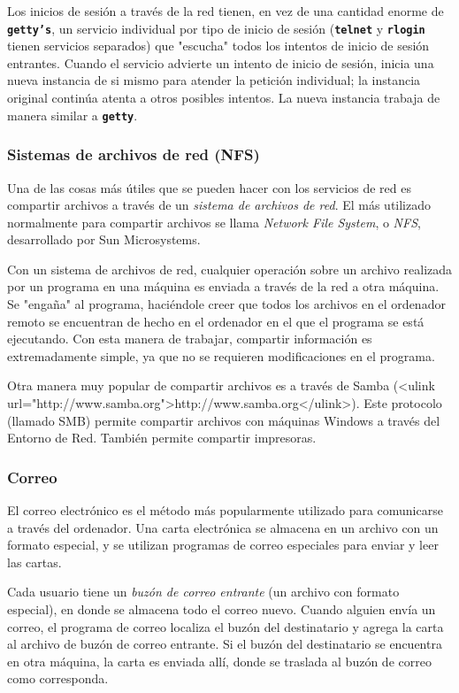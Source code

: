  Los inicios de sesión a través de la red tienen, en vez de una cantidad
enorme de \texttt{\textbf{getty's}}, un servicio individual por tipo de inicio de sesión (\texttt{\textbf{telnet}} y \texttt{\textbf{rlogin}}
tienen servicios separados) que "escucha" todos los intentos de inicio de
sesión entrantes. Cuando el servicio advierte un intento de inicio de sesión,
inicia una nueva instancia de si mismo para atender la petición individual; la
instancia original continúa atenta a otros posibles intentos. La nueva instancia
trabaja de manera similar a \texttt{\textbf{getty}}.  




\subsubsection{ Sistemas de archivos de red (NFS)}  Una de las cosas
más útiles que se pueden hacer con los servicios de red es compartir archivos a
través de un \textit{sistema de archivos de red}. El más utilizado
normalmente para compartir archivos se llama \textit{Network File
System}, o \textit{NFS}, desarrollado por Sun
Microsystems.  

 Con un sistema de archivos de red, cualquier operación sobre un archivo
realizada por un programa en una máquina es enviada a través de la red a otra
máquina. Se "engaña" al programa, haciéndole creer que todos los archivos en el
ordenador remoto se encuentran de hecho en el ordenador en el que el programa se
está ejecutando. Con esta manera de trabajar, compartir información es
extremadamente simple, ya que no se requieren modificaciones en el programa.


 Otra manera muy popular de compartir archivos es a través de Samba
(<ulink url="http://www.samba.org">http://www.samba.org</ulink>). Este protocolo
(llamado SMB) permite compartir archivos con máquinas Windows a través del
Entorno de Red. También permite compartir impresoras.  



\subsubsection{ Correo}

 El correo electrónico es el método más popularmente utilizado para
comunicarse a través del ordenador. Una carta electrónica se almacena en un
archivo con un formato especial, y se utilizan programas de correo especiales
para enviar y leer las cartas.  

 Cada usuario tiene un \textit{buzón de correo entrante} (un
archivo con formato especial), en donde se almacena todo el correo nuevo. Cuando
alguien  envía un correo, el programa de correo localiza el buzón del
destinatario y agrega la carta al archivo de buzón de correo entrante. Si el
buzón del destinatario se encuentra en otra máquina, la carta es enviada allí,
donde se traslada al buzón de correo como corresponda.  

